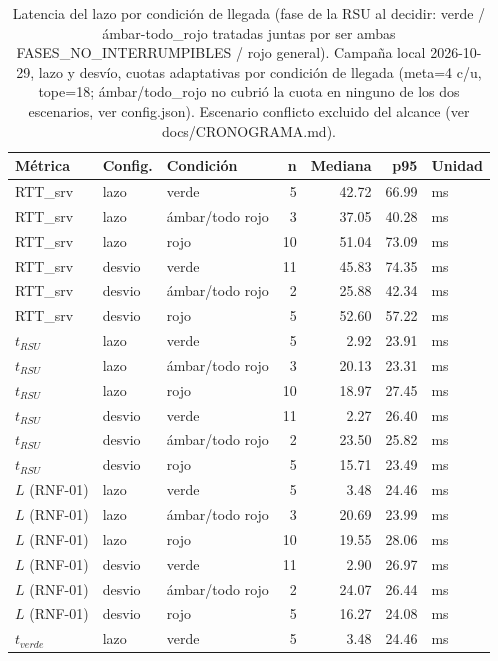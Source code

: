 \begin{table}[H]
\centering
\caption{Latencia del lazo por condición de llegada (fase de la RSU al decidir: verde / ámbar-todo\_rojo tratadas juntas por ser ambas FASES\_NO\_INTERRUMPIBLES / rojo general). Campaña local 2026-10-29, lazo y desvío, cuotas adaptativas por condición de llegada (meta=4 c/u, tope=18; ámbar/todo_rojo no cubrió la cuota en ninguno de los dos escenarios, ver config.json). Escenario conflicto excluido del alcance (ver docs/CRONOGRAMA.md).}
\label{tab:latencia_por_condicion}
\small
\begin{tabular}{lllrrrl}
\toprule
\textbf{Métrica} & \textbf{Config.} & \textbf{Condición} & \textbf{n} & \textbf{Mediana} & \textbf{p95} & \textbf{Unidad} \\
\midrule
RTT\_srv & lazo & verde & 5 & 42.72 & 66.99 & ms \\
RTT\_srv & lazo & ámbar/todo rojo & 3 & 37.05 & 40.28 & ms \\
RTT\_srv & lazo & rojo & 10 & 51.04 & 73.09 & ms \\
RTT\_srv & desvio & verde & 11 & 45.83 & 74.35 & ms \\
RTT\_srv & desvio & ámbar/todo rojo & 2 & 25.88 & 42.34 & ms \\
RTT\_srv & desvio & rojo & 5 & 52.60 & 57.22 & ms \\
$t_{RSU}$ & lazo & verde & 5 & 2.92 & 23.91 & ms \\
$t_{RSU}$ & lazo & ámbar/todo rojo & 3 & 20.13 & 23.31 & ms \\
$t_{RSU}$ & lazo & rojo & 10 & 18.97 & 27.45 & ms \\
$t_{RSU}$ & desvio & verde & 11 & 2.27 & 26.40 & ms \\
$t_{RSU}$ & desvio & ámbar/todo rojo & 2 & 23.50 & 25.82 & ms \\
$t_{RSU}$ & desvio & rojo & 5 & 15.71 & 23.49 & ms \\
$L$ (RNF-01) & lazo & verde & 5 & 3.48 & 24.46 & ms \\
$L$ (RNF-01) & lazo & ámbar/todo rojo & 3 & 20.69 & 23.99 & ms \\
$L$ (RNF-01) & lazo & rojo & 10 & 19.55 & 28.06 & ms \\
$L$ (RNF-01) & desvio & verde & 11 & 2.90 & 26.97 & ms \\
$L$ (RNF-01) & desvio & ámbar/todo rojo & 2 & 24.07 & 26.44 & ms \\
$L$ (RNF-01) & desvio & rojo & 5 & 16.27 & 24.08 & ms \\
$t_{verde}$ & lazo & verde & 5 & 3.48 & 24.46 & ms \\

\end{tabular}
\end{table}
